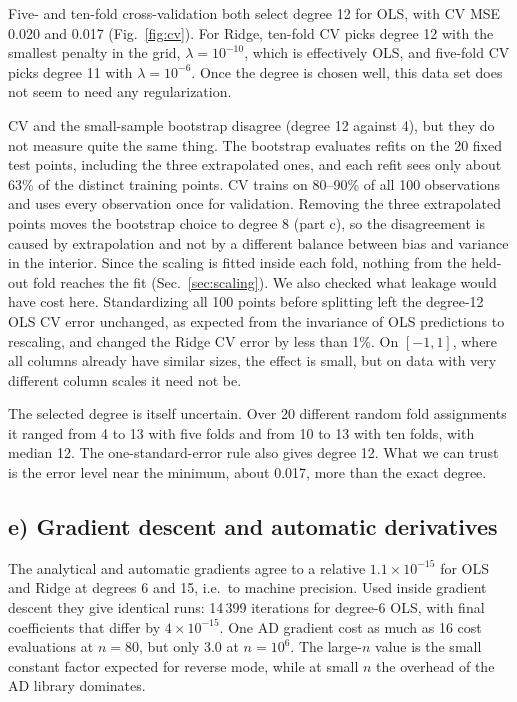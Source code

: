 \documentclass[aps,prb,reprint,superscriptaddress,nofootinbib,longbibliography,floatfix]{revtex4-2}
\begin{document}
Five- and ten-fold cross-validation both select degree 12 for OLS, with CV MSE 0.020 and 0.017 (Fig.~\ref{fig:cv}). For Ridge, ten-fold CV picks degree 12 with the smallest penalty in the grid, $\lambda=10^{-10}$, which is effectively OLS, and five-fold CV picks degree 11 with $\lambda=10^{-6}$. Once the degree is chosen well, this data set does not seem to need any regularization.

CV and the small-sample bootstrap disagree (degree 12 against 4), but they do not measure quite the same thing. The bootstrap evaluates refits on the 20 fixed test points, including the three extrapolated ones, and each refit sees only about 63\% of the distinct training points. CV trains on 80--90\% of all 100 observations and uses every observation once for validation. Removing the three extrapolated points moves the bootstrap choice to degree 8 (part c), so the disagreement is caused by extrapolation and not by a different balance between bias and variance in the interior. Since the scaling is fitted inside each fold, nothing from the held-out fold reaches the fit (Sec.~\ref{sec:scaling}). We also checked what leakage would have cost here. Standardizing all 100 points before splitting left the degree-12 OLS CV error unchanged, as expected from the invariance of OLS predictions to rescaling, and changed the Ridge CV error by less than 1\%. On $[-1,1]$, where all columns already have similar sizes, the effect is small, but on data with very different column scales it need not be.

The selected degree is itself uncertain. Over 20 different random fold assignments it ranged from 4 to 13 with five folds and from 10 to 13 with ten folds, with median 12. The one-standard-error rule \cite[Sec.~3.14]{HjorthJensen2026} also gives degree 12. What we can trust is the error level near the minimum, about 0.017, more than the exact degree.

\subsection{e) Gradient descent and automatic derivatives}\label{sec:res_gd}
The analytical and automatic gradients agree to a relative $1.1\times10^{-15}$ for OLS and Ridge at degrees 6 and 15, i.e.\ to machine precision. Used inside gradient descent they give identical runs: 14\,399 iterations for degree-6 OLS, with final coefficients that differ by $4\times10^{-15}$. One AD gradient cost as much as 16 cost evaluations at $n=80$, but only 3.0 at $n=10^6$. The large-$n$ value is the small constant factor expected for reverse mode, while at small $n$ the overhead of the AD library dominates.
\end{document}
